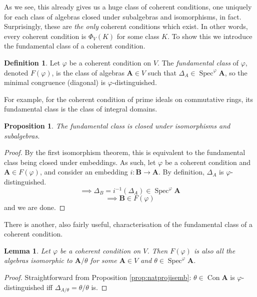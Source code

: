 \documentclass{article}
\theoremstyle{plain}
\newtheorem{lemma}[theorem]{Lemma}
\newtheorem{proposition}[theorem]{Proposition}
\theoremstyle{definition}
\newtheorem{definition}{Definition}[section]
\newcommand{\Spec}{\operatorname{Spec}}
\begin{document}
As we see, this already gives us a huge class of coherent conditions, one uniquely for each class of algebras closed under subalgebras and isomorphisms, in fact.
Surprisingly, these are \textit{the only} coherent conditions which exist.
In other words, every coherent condition is $\Phi_V(K)$ for some class $K$.
To show this we introduce the fundamental class of a coherent condition.

\begin{definition}
    Let $\varphi$ be a coherent condition on $V$.
    The \textit{fundamental class} of $\varphi$, denoted $F(\varphi)$, is the class of algebras $\mathbf{A} \in V$ such that $\Delta_A \in \Spec^\varphi\mathbf{A}$, so the minimal congruence (diagonal) is $\varphi$-distinguished.
\end{definition}

For example, for the coherent condition of prime ideals on commutative rings, its fundamental class is the class of integral domains.

\begin{proposition}
    The fundamental class is closed under isomorphisms and subalgebras.
\end{proposition}
\begin{proof}
    By the first isomorphism theorem, this is equivalent to the fundamental class being closed under embeddings.
    As such, let $\varphi$ be a coherent condition and $\mathbf{A} \in F(\varphi)$, and consider an embedding $i \colon \mathbf{B} \rightarrow \mathbf{A}$.
    By definition, $\Delta_A$ is $\varphi$-distinguished.
    $$\implies \Delta_B = i^{-1}(\Delta_A) \in \Spec^\varphi\mathbf{A}$$
    $$\implies \mathbf{B} \in F(\varphi)$$
    and we are done.
\end{proof}

There is another, also fairly useful, characterisation of the fundamental class of a coherent condition.

\begin{lemma} \label{lem:altfundclassdef}
    Let $\varphi$ be a coherent condition on $V$.
    Then $F(\varphi)$ is also all the algebras isomorphic to $\mathbf{A}/\theta$ for some $\mathbf{A} \in V$ and $\theta \in \Spec^\varphi\mathbf{A}$. 
\end{lemma}
\begin{proof}
    Straightforward from Proposition \ref{prop:natprojisemb}: $\theta\in \operatorname{Con}\mathbf{A}$ is $\varphi$-distinguished iff $\Delta_{A/\theta} = \theta/\theta$ is.
\end{proof}
\end{document}
